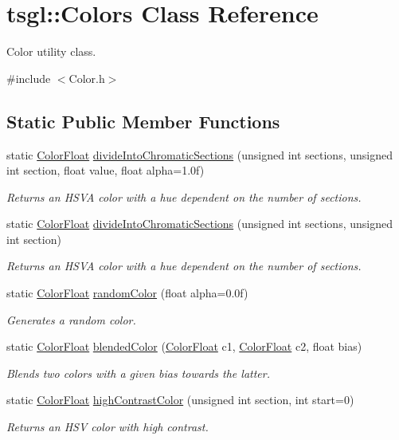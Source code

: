 \hypertarget{classtsgl_1_1_colors}{}\section{tsgl\+:\+:Colors Class Reference}
\label{classtsgl_1_1_colors}


Color utility class.  




{\ttfamily \#include $<$Color.\+h$>$}

\subsection*{Static Public Member Functions}
\begin{DoxyCompactItemize}
\item 
static \hyperlink{structtsgl_1_1_color_float}{Color\+Float} \hyperlink{classtsgl_1_1_colors_a9cb187fa332b6a0fb568db13ed6ca6e5}{divide\+Into\+Chromatic\+Sections} (unsigned int sections, unsigned int section, float value, float alpha=1.\+0f)
\begin{DoxyCompactList}\small\item\em Returns an H\+S\+V\+A color with a hue dependent on the number of sections. \end{DoxyCompactList}\item 
static \hyperlink{structtsgl_1_1_color_float}{Color\+Float} \hyperlink{classtsgl_1_1_colors_a7af4977f5cbd3ceb868274061a195f15}{divide\+Into\+Chromatic\+Sections} (unsigned int sections, unsigned int section)
\begin{DoxyCompactList}\small\item\em Returns an H\+S\+V\+A color with a hue dependent on the number of sections. \end{DoxyCompactList}\item 
static \hyperlink{structtsgl_1_1_color_float}{Color\+Float} \hyperlink{classtsgl_1_1_colors_a0f28a13af4a0fc352a250c23ecc97e4f}{random\+Color} (float alpha=0.\+0f)
\begin{DoxyCompactList}\small\item\em Generates a random color. \end{DoxyCompactList}\item 
static \hyperlink{structtsgl_1_1_color_float}{Color\+Float} \hyperlink{classtsgl_1_1_colors_ad80ab51c314f84ea53f9af81e54f8d51}{blended\+Color} (\hyperlink{structtsgl_1_1_color_float}{Color\+Float} c1, \hyperlink{structtsgl_1_1_color_float}{Color\+Float} c2, float bias)
\begin{DoxyCompactList}\small\item\em Blends two colors with a given bias towards the latter. \end{DoxyCompactList}\item 
static \hyperlink{structtsgl_1_1_color_float}{Color\+Float} \hyperlink{classtsgl_1_1_colors_a4493f4a4f0a687b59491e5dff83d9ed1}{high\+Contrast\+Color} (unsigned int section, int start=0)
\begin{DoxyCompactList}\small\item\em Returns an H\+S\+V color with high contrast. \end{DoxyCompactList}\end{DoxyCompactItemize}


